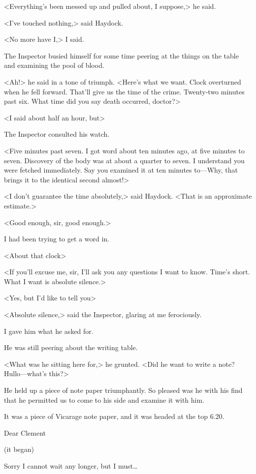 <Everything's been messed up and pulled about, I suppose,> he said.

<I've touched nothing,> said Haydock.

<No more have I,> I said.

The Inspector busied himself for some time peering at the things on the table and examining the pool of blood.

<Ah!> he said in a tone of triumph. <Here's what we want. Clock overturned when he fell forward. That'll give us the time of the crime. Twenty-two minutes past six. What time did you say death occurred, doctor?>

<I said about half an hour, but\longdash>

The Inspector consulted his watch.

<Five minutes past seven. I got word about ten minutes ago, at five minutes to seven. Discovery of the body was at about a quarter to seven. I understand you were fetched immediately. Say you examined it at ten minutes to—Why, that brings it to the identical second almost!>

<I don't guarantee the time absolutely,> said Haydock. <That is an approximate estimate.>

<Good enough, sir, good enough.>

I had been trying to get a word in.

<About that clock\longdash>

<If you'll excuse me, sir, I'll ask you any questions I want to know. Time's short. What I want is absolute silence.>

<Yes, but I'd like to tell you\longdash>

<Absolute silence,> said the Inspector, glaring at me ferociously.

I gave him what he asked for.

He was still peering about the writing table.

<What was he sitting here for,> he grunted. <Did he want to write a note? Hullo—what's this?>

He held up a piece of note paper triumphantly. So pleased was he with his find that he permitted us to come to his side and examine it with him.

It was a piece of Vicarage note paper, and it was headed at the top 6.20.

\begin{mail}{}{Dear Clement}

\pausemail
(it began)
\resumemail

Sorry I cannot wait any longer, but I must\dots 
\end{mail}


